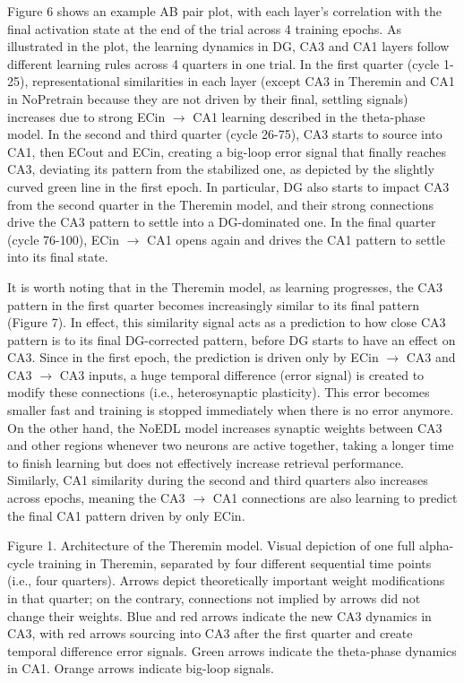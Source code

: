 \documentclass[11pt,twoside]{article}
\newif\myifpdf
\begin{document}
Figure 6 shows an example AB pair plot, with each layer's correlation with the final activation state at the end of the trial across 4 training epochs.  As illustrated in the plot, the learning dynamics in DG, CA3 and CA1 layers follow different learning rules across 4 quarters in one trial.  In the first quarter (cycle 1-25), representational similarities in each layer (except CA3 in Theremin and CA1 in NoPretrain because they are not driven by their final, settling signals) increases due to strong ECin $\rightarrow$ CA1 learning described in the theta-phase model.  In the second and third quarter (cycle 26-75), CA3 starts to source into CA1, then ECout and ECin, creating a big-loop error signal that finally reaches CA3, deviating its pattern from the stabilized one, as depicted by the slightly curved green line in the first epoch.  In particular, DG also starts to impact CA3 from the second quarter in the Theremin model, and their strong connections drive the CA3 pattern to settle into a DG-dominated one.  In the final quarter (cycle 76-100), ECin $\rightarrow$ CA1 opens again and drives the CA1 pattern to settle into its final state.  

It is worth noting that in the Theremin model, as learning progresses, the CA3 pattern in the first quarter becomes increasingly similar to its final pattern (Figure 7). In effect, this similarity signal acts as a prediction to how close CA3 pattern is to its final DG-corrected pattern, before DG starts to have an effect on CA3. Since in the first epoch, the prediction is driven only by ECin $\rightarrow$ CA3 and CA3 $\rightarrow$ CA3 inputs, a huge temporal difference (error signal) is created to modify these connections (i.e., heterosynaptic plasticity). This error becomes smaller fast and training is stopped immediately when there is no error anymore. On the other hand, the NoEDL model increases synaptic weights between CA3 and other regions whenever two neurons are active together, taking a longer time to finish learning but does not effectively increase retrieval performance. Similarly, CA1 similarity during the second and third quarters also increases across epochs, meaning the CA3 $\rightarrow$ CA1 connections are also learning to predict the final CA1 pattern driven by only ECin. 

Figure 1. Architecture of the Theremin model. Visual depiction of one full alpha-cycle training in Theremin, separated by four different sequential time points (i.e., four quarters). Arrows depict theoretically important weight modifications in that quarter; on the contrary, connections not implied by arrows did not change their weights. Blue and red arrows indicate the new CA3 dynamics in CA3, with red arrows sourcing into CA3 after the first quarter and create temporal difference error signals. Green arrows indicate the theta-phase \citep{KetzMorkondaOReilly13} dynamics in CA1. Orange arrows indicate big-loop signals.
\end{document}
